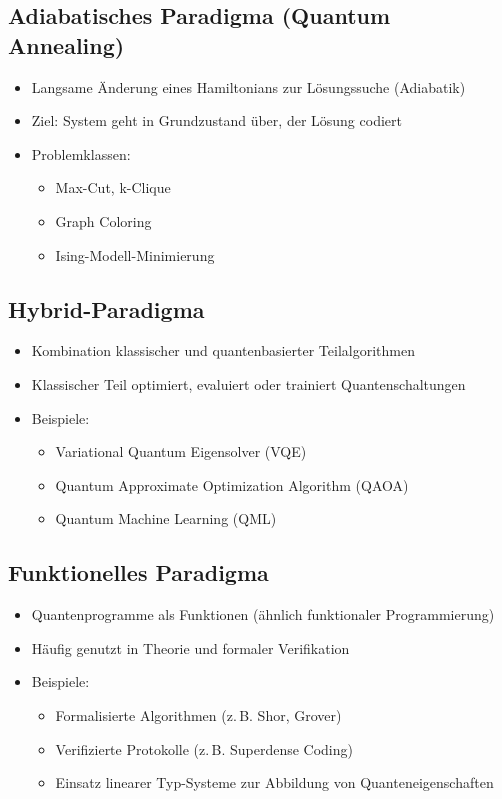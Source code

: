 \subsection{Adiabatisches Paradigma (Quantum Annealing)}
\begin{itemize}
    \item Langsame Änderung eines Hamiltonians zur Lösungssuche (Adiabatik)
    \item Ziel: System geht in Grundzustand über, der Lösung codiert
    \item Problemklassen:
    \begin{itemize}
        \item Max-Cut, k-Clique
        \item Graph Coloring
        \item Ising-Modell-Minimierung
    \end{itemize}
\end{itemize}

\subsection{Hybrid-Paradigma}
\begin{itemize}
    \item Kombination klassischer und quantenbasierter Teilalgorithmen
    \item Klassischer Teil optimiert, evaluiert oder trainiert Quantenschaltungen
    \item Beispiele:
    \begin{itemize}
        \item Variational Quantum Eigensolver (VQE)
        \item Quantum Approximate Optimization Algorithm (QAOA)
        \item Quantum Machine Learning (QML)
    \end{itemize}
\end{itemize}

\subsection{Funktionelles Paradigma}
\begin{itemize}
    \item Quantenprogramme als Funktionen (ähnlich funktionaler Programmierung)
    \item Häufig genutzt in Theorie und formaler Verifikation
    \item Beispiele: 
    \begin{itemize}
        \item Formalisierte Algorithmen (z.\,B. Shor, Grover)
        \item Verifizierte Protokolle (z.\,B. Superdense Coding)
        \item Einsatz linearer Typ-Systeme zur Abbildung von Quanteneigenschaften
    \end{itemize}
\end{itemize}

